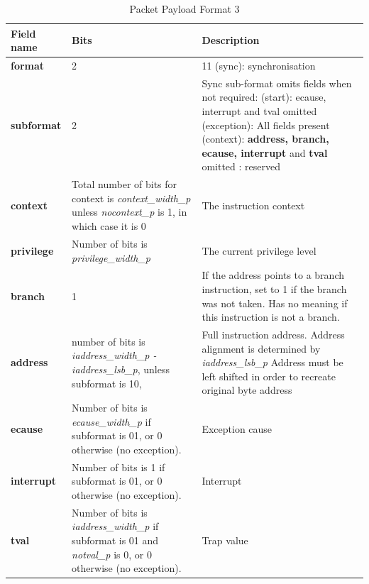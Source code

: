 \begin{table}[htp]
    \centering
    \caption{Packet Payload Format 3}
    \label{tab:te_inst3}
    \begin{tabulary}{\textwidth}{|l|p{35mm}|p{80mm}|}
      \hline
          {\bf Field name} & {\bf Bits} & {\bf Description} \\
          \hline
          \textbf{format} & 2 & 11 (sync): synchronisation\\
          \hline
          \textbf{subformat} & 2 & Sync sub-format omits fields when not required:  (start): ecause, interrupt and tval omitted  (exception): All fields present (context): \textbf{address, branch, ecause, interrupt} and \textbf {tval} omitted  : reserved \\
          \hline
          \textbf{context} &  Total number of bits 
                     for context is  
                     \textit {context\_width\_p} 
                     unless  
                     \textit {nocontext\_p} is 1,  
                     in which case it is 0 & 
                     The instruction context \\
          \hline
          \textbf{privilege} & Number of bits is  
                      \textit {privilege\_width\_p} & 
                      The current privilege level \\
          \hline
          \textbf{branch} & 1 & If the address points to a branch instruction, set to 1 if the branch was not taken. 
          Has no meaning if this instruction is not a branch. \\
          \hline
          \textbf{address} & number of bits is  
                    \textit {iaddress\_width\_p - iaddress\_lsb\_p},  
                    unless subformat is 10, & 
                    Full instruction address.  Address alignment is determined by \textit {iaddress\_lsb\_p} Address must be left shifted in order to recreate original byte address \\
          \hline
          \textbf{ecause} & Number of bits is  
                   \textit {ecause\_width\_p} if  
                   subformat is 01,  
                   or 0 otherwise  
                   (no exception). & 
                   Exception cause \\
          \hline
          \textbf{interrupt} & Number of bits is  
                      1 if subformat is 01,  
                      or 0 otherwise (no exception). & 
                      Interrupt \\
          \hline
          \textbf{tval} & Number of bits is  
                 \textit {iaddress\_width\_p}  
                 if subformat is  
                 01 and \textit {notval\_p} is 
                 0, or 0 otherwise  
                 (no exception). & 
                 Trap value \\
          \hline
    \end{tabulary}
\end{table}

